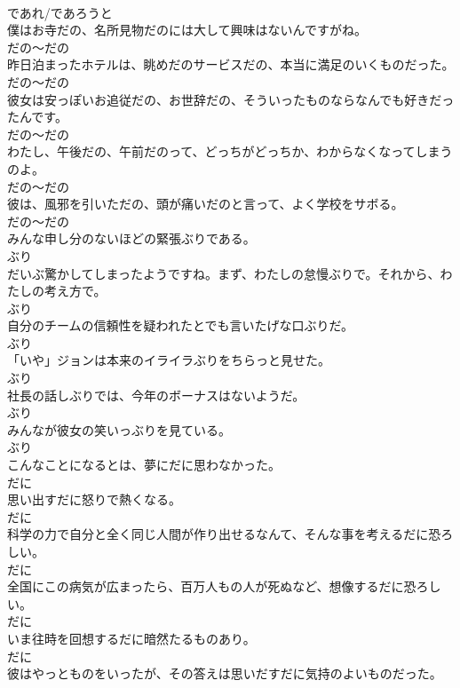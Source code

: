\documentclass[8pt]{extreport}
\begin{document}
\begin{CJK}{UTF8}{min}
\\	であれ/であろうと	
\\	僕はお寺だの、名所見物だのには大して興味はないんですがね。	
\\	だの～だの	
\\	昨日泊まったホテルは、眺めだのサービスだの、本当に満足のいくものだった。	
\\	だの～だの	
\\	彼女は安っぽいお追従だの、お世辞だの、そういったものならなんでも好きだったんです。	
\\	だの～だの	
\\	わたし、午後だの、午前だのって、どっちがどっちか、わからなくなってしまうのよ。	
\\	だの～だの	
\\	彼は、風邪を引いただの、頭が痛いだのと言って、よく学校をサボる。	
\\	だの～だの	
\\	みんな申し分のないほどの緊張ぶりである。	
\\	ぶり	
\\	だいぶ驚かしてしまったようですね。まず、わたしの怠慢ぶりで。それから、わたしの考え方で。	
\\	ぶり	
\\	自分のチームの信頼性を疑われたとでも言いたげな口ぶりだ。	
\\	ぶり	
\\	「いや」ジョンは本来のイライラぶりをちらっと見せた。	
\\	ぶり	
\\	社長の話しぶりでは、今年のボーナスはないようだ。	
\\	ぶり	
\\	みんなが彼女の笑いっぶりを見ている。	
\\	ぶり	
\\	こんなことになるとは、夢にだに思わなかった。	
\\	だに	
\\	思い出すだに怒りで熱くなる。	
\\	だに	
\\	科学の力で自分と全く同じ人間が作り出せるなんて、そんな事を考えるだに恐ろしい。	
\\	だに	
\\	全国にこの病気が広まったら、百万人もの人が死ぬなど、想像するだに恐ろしい。	
\\	だに	
\\	いま往時を回想するだに暗然たるものあり。	
\\	だに	
\\	彼はやっとものをいったが、その答えは思いだすだに気持のよいものだった。	

\end{CJK}
\end{document}
